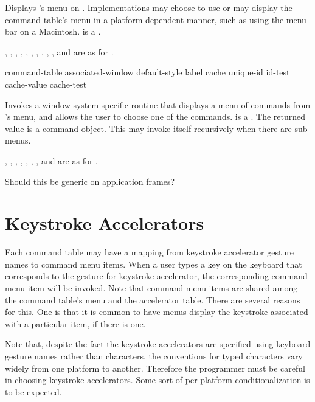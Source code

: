 Displays 's menu on .  Implementations may choose
to use  or may display the command table's menu in a
platform dependent manner, such as using the menu bar on a Macintosh.
 is a .

, , , ,
, , , ,
, , and  are as for
.

 {command-table 
                                                 \key associated-window default-style label
                                                      cache unique-id id-test
                                                      cache-value cache-test}

Invokes a window system specific routine that displays a menu of commands from
's menu, and allows the user to choose one of the commands.
 is a .  The returned value is
a command object.  This may invoke itself recursively when there are sub-menus.

, , , ,
, , , and  are as
for .

 {Should this be generic on application frames?}


\section {Keystroke Accelerators}

Each command table may have a mapping from keystroke accelerator gesture names
to command menu items.  When a user types a key on the keyboard that corresponds
to the gesture for keystroke accelerator, the corresponding command menu item
will be invoked.  Note that command menu items are shared among the command
table's menu and the accelerator table.  There are several reasons for this.
One is that it is common to have menus display the keystroke associated with a
particular item, if there is one.

Note that, despite the fact the keystroke accelerators are specified using
keyboard gesture names rather than characters, the conventions for typed
characters vary widely from one platform to another.  Therefore the programmer
must be careful in choosing keystroke accelerators.  Some sort of per-platform
conditionalization is to be expected.


